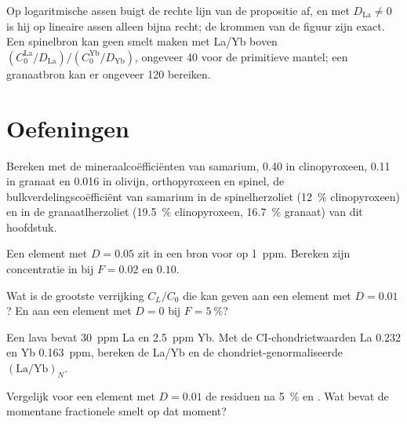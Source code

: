 Op logaritmische assen buigt de rechte lijn van de propositie af, en met
$D_{\mathrm{La}} \ne 0$ is hij op lineaire assen alleen bijna recht; de krommen
van de figuur zijn exact. Een spinelbron kan geen smelt maken met La/Yb boven
$(C_0^{\mathrm{La}}/D_{\mathrm{La}})/(C_0^{\mathrm{Yb}}/D_{\mathrm{Yb}})$,
ongeveer 40 voor de primitieve mantel; een granaatbron kan er ongeveer 120 bereiken.

\section{Oefeningen}

\begin{exercise}[$\star$]\label{exo:b3:trace-element-modelling:1}
Bereken met de mineraalcoëfficiënten van samarium, 0.40 in clinopyroxeen, 0.11 in
granaat en 0.016 in olivijn, orthopyroxeen en spinel, de bulkverdelingscoëfficiënt
van samarium in de spinelherzoliet (\qty{12}{\percent}
clinopyroxeen) en in de granaatlherzoliet (\qty{19.5}{\percent} clinopyroxeen,
\qty{16.7}{\percent} granaat) van dit hoofdstuk.
\end{exercise}

\begin{exercise}[$\star$]\label{exo:b3:trace-element-modelling:2}
Een element met $D = 0.05$ zit in een bron voor op \qty{1}{ppm}. Bereken
zijn concentratie in  bij $F = 0.02$ en $0.10$.
\end{exercise}

\begin{exercise}[$\star$]\label{exo:b3:trace-element-modelling:3}
Wat is de grootste verrijking $C_L/C_0$ die  kan geven aan een
element met $D = 0.01$? En aan een element met $D = 0$ bij
$F = \qty{5}{\percent}$?
\end{exercise}

\begin{exercise}[$\star$]\label{exo:b3:trace-element-modelling:4}
Een lava bevat \qty{30}{ppm} La en \qty{2.5}{ppm} Yb. Met de CI-chondrietwaarden
La 0.232 en Yb \qty{0.163}{ppm}, bereken de La/Yb en de
chondriet-genormaliseerde $(\mathrm{La}/\mathrm{Yb})_N$.
\end{exercise}

\begin{exercise}[$\star\star$]\label{exo:b3:trace-element-modelling:5}
Vergelijk voor een element met $D = 0.01$ de residuen na \qty{5}{\percent}
 en . Wat bevat de momentane
fractionele smelt op dat moment?
\end{exercise}

